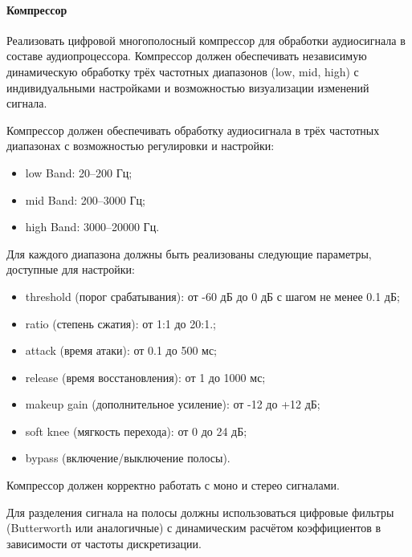 \paragraph{Компрессор}

Реализовать цифровой многополосный компрессор для обработки аудиосигнала в составе аудиопроцессора. Компрессор должен обеспечивать независимую динамическую обработку трёх частотных диапазонов (low, mid, high) с индивидуальными настройками и возможностью визуализации изменений сигнала.

Компрессор должен обеспечивать обработку аудиосигнала в трёх частотных диапазонах с возможностью регулировки и настройки:
\begin{itemize}
	\item low Band: 20–200 Гц;
	\item mid Band: 200–3000 Гц;
	\item high Band: 3000–20000 Гц.
\end{itemize}

Для каждого диапазона должны быть реализованы следующие параметры, доступные для настройки:
\begin{itemize}
	\item threshold (порог срабатывания): от -60 дБ до 0 дБ с шагом не менее 0.1 дБ;
	\item ratio (степень сжатия): от 1:1 до 20:1.;
	\item attack (время атаки): от 0.1 до 500 мс;
	\item release (время восстановления): от 1 до 1000 мс;
	\item makeup gain (дополнительное усиление): от -12 до +12 дБ;
	\item soft knee (мягкость перехода): от 0 до 24 дБ;
	\item bypass (включение/выключение полосы).
\end{itemize}

Компрессор должен корректно работать с моно и стерео сигналами.

Для разделения сигнала на полосы должны использоваться цифровые фильтры (Butterworth или аналогичные) с динамическим расчётом коэффициентов в зависимости от частоты дискретизации.

